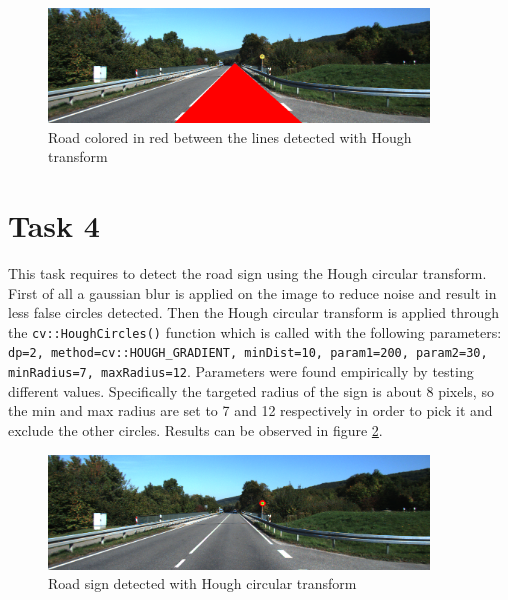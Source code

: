 \documentclass{article}
\begin{document}
\begin{figure}[H]
	\centering
	\includegraphics[width=0.9\textwidth]{street_scene_HoughRoadRed.png}
	\caption{Road colored in red between the lines detected with Hough transform}
	\label{fig:road_red_Hough}
\end{figure}


\section*{Task 4}
This task requires to detect the road sign using the Hough circular transform.
First of all a gaussian blur is applied on the image to reduce noise and result in less false circles detected.
Then the Hough circular transform is applied through the \texttt{cv::HoughCircles()} function which is called with the following parameters: \texttt{dp=2, method=cv::HOUGH\_GRADIENT, minDist=10, param1=200, param2=30, minRadius=7, maxRadius=12}.
Parameters were found empirically by testing different values. Specifically the targeted radius of the sign is about 8 pixels, so the min and max radius are set to 7 and 12 respectively in order to pick it and exclude the other circles.
Results can be observed in figure \ref{fig:sign_Hough}.

\begin{figure}[H]
	\centering
	\includegraphics[width=0.9\textwidth]{street_scene_HoughSign.png}
	\caption{Road sign detected with Hough circular transform}
	\label{fig:sign_Hough}
\end{figure}
\end{document}
